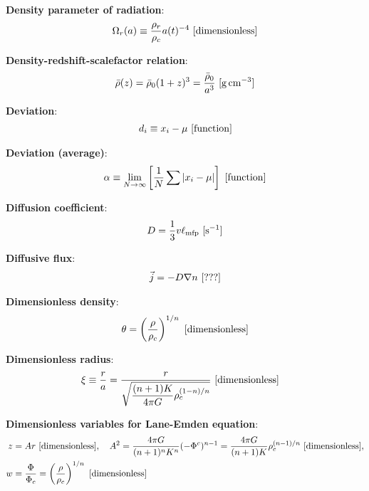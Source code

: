 \documentclass[a4paper,10pt]{article}
\begin{document}
{\noindent}\textbf{Density parameter of radiation}:
\begin{align*}
    \Omega_r(a) \equiv \dfrac{\rho_r}{\rho_c}a(t)^{-4} ~ [{\rm dimensionless}]
\end{align*}

{\noindent}\textbf{Density-redshift-scalefactor relation}:
\begin{align*}
    \bar{\rho}(z) = \bar{\rho}_0(1+z)^3 = \frac{\bar{\rho}_0}{a^3} ~ [{\rm g\,cm^{-3}}]
\end{align*}

{\noindent}\textbf{Deviation}:
\begin{align*}
    d_i \equiv x_i - \mu ~ [{\rm function}]
\end{align*}

{\noindent}\textbf{Deviation (average)}:
\begin{align*}
    \alpha \equiv \lim_{N\rightarrow\infty}\left[ \frac{1}{N} \sum \left\lvert x_i-\mu\right\rvert \right] ~ [{\rm function}]
\end{align*}

{\noindent}\textbf{Diffusion coefficient}:
\begin{align*}
    D = \frac{1}{3}v\ell_{\rm mfp} ~ [{\rm s^{-1}}]
\end{align*}

{\noindent}\textbf{Diffusive flux}:
\begin{align*}
    \vec{j} = -D\nabla n ~ [{\rm ???}]
\end{align*}

{\noindent}\textbf{Dimensionless density}:
\begin{align*}
    \theta = \left(\frac{\rho}{\rho_c}\right)^{1/n} ~ [{\rm dimensionless}]
\end{align*}

{\noindent}\textbf{Dimensionless radius}:
\begin{align*}
    \xi &\equiv \frac{r}{a} = \frac{r}{\sqrt{\dfrac{(n+1)K}{4\pi G}\rho_c^{(1-n)/n}}} ~ [{\rm dimensionless}]
\end{align*}

{\noindent}\textbf{Dimensionless variables for Lane-Emden equation}:
\begin{align*}
    z &= Ar ~ [{\rm dimensionless}], ~~~ A^2 = \frac{4\pi G}{(n+1)^nK^n}(-\Phi^c)^{n-1} = \frac{4\pi G}{(n+1)K}\rho_c^{(n-1)/n} ~ [{\rm dimensionless}],\\
    w &= \frac{\Phi}{\Phi_c} = \left(\frac{\rho}{\rho_c}\right)^{1/n} ~ [{\rm dimensionless}]
\end{align*}
\end{document}
